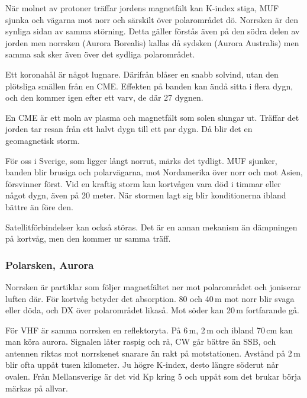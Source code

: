 När molnet av protoner träffar jordens magnetfält kan K-index stiga,
MUF sjunka och vägarna mot norr och särskilt över polarområdet
dö. Norrsken är den synliga sidan av samma störning. Detta gäller
förstås även på den södra delen av jorden men norrsken (Aurora
Borealis) kallas då sydsken (Aurora Australis) men samma sak sker även
över det sydliga polarområdet.

Ett koronahål är något lugnare. Därifrån blåser en snabb solvind, utan
den plötsliga smällen från en CME. Effekten på banden kan ändå sitta i
flera dygn, och den kommer igen efter ett varv, de där 27 dygnen.

En CME är ett moln av plasma och magnetfält som solen slungar ut. Träffar
det jorden tar resan från ett halvt dygn till ett par dygn. Då blir det en
geomagnetisk storm.

För oss i Sverige, som ligger långt norrut, märks det tydligt. MUF sjunker,
banden blir brusiga och polarvägarna, mot Nordamerika över norr och mot
Asien, försvinner först. Vid en kraftig storm kan kortvågen vara död i
timmar eller något dygn, även på 20 meter. När stormen lagt sig blir
konditionerna ibland bättre än före den.

Satellitförbindelser kan också störas. Det är en annan mekanism än
dämpningen på kortvåg, men den kommer ur samma träff.

\subsubsection{Polarsken, Aurora}
 

Norrsken är partiklar som följer magnetfältet ner mot polarområdet och
joniserar luften där. För kortvåg betyder det absorption. 80 och 40\,m mot
norr blir svaga eller döda, och DX över polarområdet likaså. Mot söder kan
20\,m fortfarande gå.

För VHF är samma norrsken en reflektoryta. På 6\,m, 2\,m och ibland 70\,cm
kan man köra aurora. Signalen låter raspig och rå, CW går bättre än SSB,
och antennen riktas mot norrskenet snarare än rakt på motstationen.
Avstånd på 2\,m blir ofta uppåt tusen kilometer. Ju högre K-index, desto
längre söderut når ovalen. Från Mellansverige är det vid Kp kring 5 och
uppåt som det brukar börja märkas på allvar.

